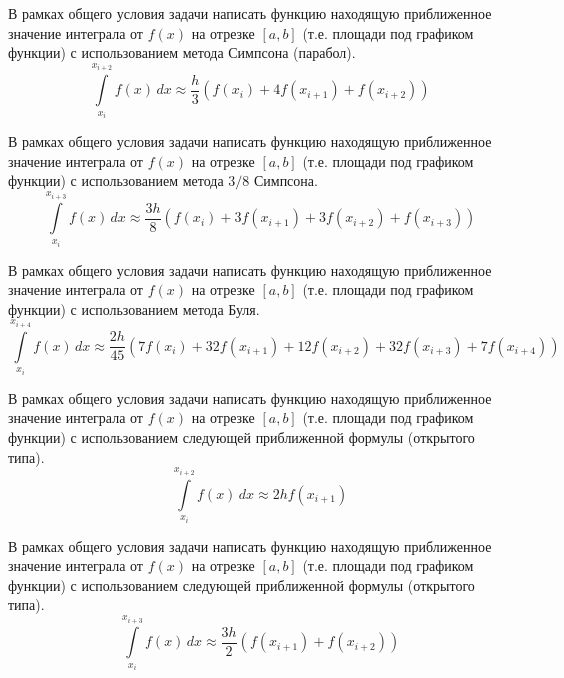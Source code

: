 
\begin{zztask}
В рамках общего условия задачи написать функцию находящую приближенное значение 
интеграла от $f(x)$ на отрезке $[a, b]$ (т.е. площади под графиком функции)
с использованием метода Симпсона (парабол).
\[
\int\limits_{x_i}^{x_{i+2}} f(x)\,dx \approx 
\frac{h}{3} \left(f(x_i) + 4 f(x_{i+1}) + f(x_{i+2})\right)
\]
\end{zztask}


\begin{zztask}
В рамках общего условия задачи написать функцию находящую приближенное значение 
интеграла от $f(x)$ на отрезке $[a, b]$ (т.е. площади под графиком функции)
с использованием метода $3/8$ Симпсона.
\[
\int\limits_{x_i}^{x_{i+3}} f(x)\,dx \approx 
\frac{3h}{8} \left(f(x_i) + 3 f(x_{i+1}) + 3 f(x_{i+2}) + f(x_{i+3})\right)
\]
\end{zztask}


\begin{zztask}
В рамках общего условия задачи написать функцию находящую приближенное значение 
интеграла от $f(x)$ на отрезке $[a, b]$ (т.е. площади под графиком функции)
с использованием метода Буля.
\[
\int\limits_{x_i}^{x_{i+4}} f(x)\,dx \approx 
\frac{2h}{45} \left(7 f(x_i) + 32 f(x_{i+1}) + 12 f(x_{i+2}) + 32 f(x_{i+3}) + 7 f(x_{i+4})\right)
\]
\end{zztask}


\begin{zztask}
В рамках общего условия задачи написать функцию находящую приближенное значение 
интеграла от $f(x)$ на отрезке $[a, b]$ (т.е. площади под графиком функции)
с использованием следующей приближенной формулы (открытого типа). 
\[
\int\limits_{x_i}^{x_{i+2}} f(x)\,dx \approx 2h f(x_{i+1})
\]
\end{zztask}


\begin{zztask}
В рамках общего условия задачи написать функцию находящую приближенное значение 
интеграла от $f(x)$ на отрезке $[a, b]$ (т.е. площади под графиком функции)
с использованием следующей приближенной формулы (открытого типа). 
\[
\int\limits_{x_i}^{x_{i+3}} f(x)\,dx \approx \frac{3h}{2} \left( f(x_{i+1}) + f(x_{i+2}) \right)
\]
\end{zztask}

